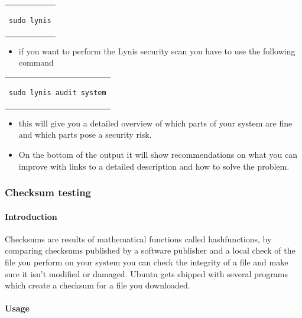 \documentclass[a4paper,10pt]{article}
\begin{document}
\begin{center}
\begin{tabular}{c}
\begin{lstlisting}
sudo lynis
\end{lstlisting}
\end{tabular}
\end{center}

\begin{itemize}[leftmargin=*]
\item if you want to perform the Lynis security scan you have to use the following command
\end{itemize}

\begin{center}
\begin{tabular}{c}
\begin{lstlisting}
sudo lynis audit system
\end{lstlisting}
\end{tabular}
\end{center}

\begin{itemize}[leftmargin=*]
\item this will give you a detailed overview of which parts of your system are fine and which parts pose a security risk. 
\item On the bottom of the output it will show recommendations on what you can improve with links to a detailed description and how to solve the problem.
\end{itemize}

\subsubsection{Checksum testing}

\paragraph{Introduction}
Checksums are results of mathematical functions called hashfunctions, by comparing checksums published by a software publisher and a local check of the file you perform on your system you can check the integrity of a file and make sure it isn't modified or damaged. Ubuntu gets shipped with several programs which create a checksum for a file you downloaded.

\paragraph{Usage}
\end{document}
